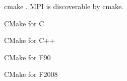
\begin{numberedframe}{cmake}
  \label{sl:mpi-cmake}.
  MPI is discoverable by cmake.
\end{numberedframe}

\begin{c}
  \begin{numberedframe}{CMake for C}
    
  \end{numberedframe}
\end{c}

\begin{cxx}
  \begin{numberedframe}{CMake for C++}
    
  \end{numberedframe}
\end{cxx}

\begin{fortran}
\begin{numberedframe}{CMake for F90}

\end{numberedframe}
\end{fortran}

\begin{fortran}
\begin{numberedframe}{CMake for F2008}

\end{numberedframe}
\end{fortran}


